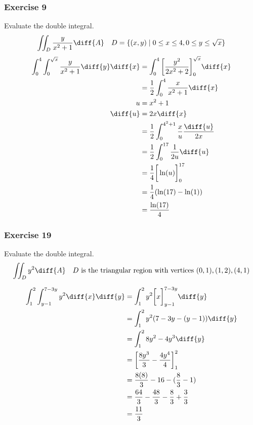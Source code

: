 \documentclass{math}
\begin{document}
\subsubsection*{Exercise 9}
Evaluate the double integral.
\[ \iint_{D}\frac{y}{x^2+1}\diff{A} \quad
    D = \{(x,y)\mid0\le x\le4,0\le y\le\sqrt{x}\} \]
\begin{align*}
  \int_{0}^{4}\int_{0}^{\sqrt{x}}\frac{y}{x^2+1}\diff{y}\diff{x}
    &= \int_{0}^{4}\bigg[\frac{y^2}{2x^2+2}\bigg]_{0}^{\sqrt{x}}\diff{x} \\
  &= \frac{1}{2}\int_{0}^{4}\frac{x}{x^2+1}\diff{x} \\
  u &= x^2+1 \\
  \diff{u} &= 2x\diff{x} \\
  &= \frac{1}{2}\int_{0}^{4^2+1}\frac{x}{u}\frac{\diff{u}}{2x} \\
  &= \frac{1}{2}\int_{0}^{17}\frac{1}{2u}\diff{u} \\
  &= \frac{1}{4}\bigg[\ln(u)\bigg]_0^{17} \\
  &= \frac{1}{4}(\ln(17)-\ln(1)) \\
  &= \frac{\ln(17)}{4}
\end{align*}

\subsubsection*{Exercise 19}
Evaluate the double integral.
\[ \iint_{D}y^2\diff{A} \quad D \text{ is the triangular region with vertices }
  (0,1), (1,2), (4,1) \]
\begin{center}
\end{center}
\begin{align*}
  \int_{1}^{2}\int_{y-1}^{7-3y}y^2\diff{x}\diff{y} &=
    \int_{1}^{2}y^2\bigg[x\bigg]_{y-1}^{7-3y}\diff{y} \\
  &= \int_{1}^{2}y^2(7-3y-(y-1))\diff{y} \\
  &= \int_{1}^{2}8y^2-4y^3\diff{y} \\
  &= \bigg[\frac{8y^3}{3}-\frac{4y^4}{4}\bigg]_{1}^{2} \\
  &= \frac{8(8)}{3}-16-(\frac{8}{3}-1) \\
  &= \frac{64}{3}-\frac{48}{3}-\frac{8}{3}+\frac{3}{3} \\
  &= \frac{11}{3}
\end{align*}
\end{document}

